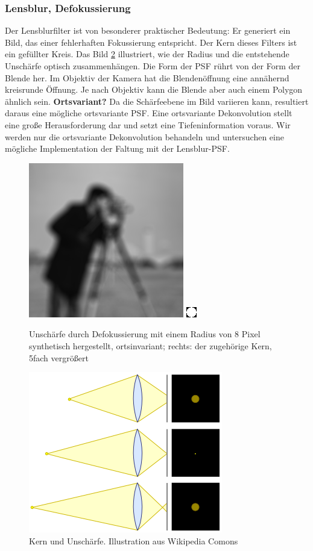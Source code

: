 \documentclass[a4paper,12pt]{article}
\begin{document}
\subsubsection{Lensblur, Defokussierung}

Der Lensblurfilter ist von besonderer praktischer Bedeutung: Er generiert ein
Bild, das einer fehlerhaften Fokussierung entspricht. Der Kern dieses Filters
ist ein gefüllter Kreis. Das Bild \ref{figure_confusion} illustriert, wie der Radius und die
entstehende Unschärfe optisch zusammenhängen. Die Form der PSF rührt von der
Form der Blende her. Im Objektiv der Kamera hat die Blendenöffnung eine
annähernd kreisrunde Öffnung. Je nach Objektiv kann die Blende aber auch einem
Polygon ähnlich sein.
\textbf{Ortsvariant?} Da die Schärfeebene im Bild variieren kann, resultiert
daraus eine mögliche ortsvariante PSF. Eine ortsvariante Dekonvolution stellt
eine große Herausforderung dar und setzt eine Tiefeninformation voraus.
Wir werden nur die ortsvariante Dekonvolution behandeln und untersuchen 
eine mögliche Implementation der Faltung mit der Lensblur-PSF.

\begin{figure}[htbp]
\centering
\includegraphics[scale=0.8]{lensblur17.png}
\includegraphics[scale=5]{kern_lensblur17.png}
\caption{Unschärfe durch Defokussierung mit einem Radius von 8 Pixel
synthetisch hergestellt, ortsinvariant; rechts: der zugehörige Kern, 5fach
vergrößert}%
\label{figure_lensblur}
\end{figure}

\begin{figure}[htbp]
\centering
\includegraphics[scale=0.5]{Cirles_of_confusion_lens_diagram.png}%
\caption{Kern und Unschärfe. Illustration aus Wikipedia Comons
\cite{circleofconfusion}}%
\label{figure_confusion}
\end{figure}
\end{document}
